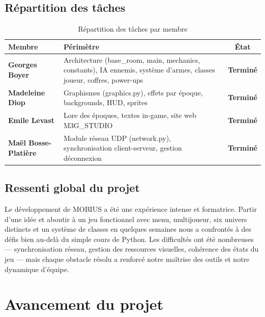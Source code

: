 \documentclass[12pt,a4paper]{article}
\begin{document}
\subsection{Répartition des tâches}

\begin{table}[H]
\centering
\caption{Répartition des tâches par membre}
\renewcommand{\arraystretch}{1.4}
\begin{tabularx}{\textwidth}{@{}>{\bfseries}lXc@{}}
\toprule
\rowcolor{tableheadbg}
\textbf{Membre} & \textbf{Périmètre} & \textbf{État} \\
\midrule
Georges Boyer       & Architecture (base\_room, main, mechanics, constants), IA ennemis, système d'armes, classes joueur, coffres, power-ups & \textcolor{okgreen}{\textbf{Terminé}} \\
\rowcolor{rowaltbg}
Madeleine Diop      & Graphismes (graphics.py), effets par époque, backgrounds, HUD, sprites & \textcolor{okgreen}{\textbf{Terminé}} \\
Emile Levast        & Lore des époques, textes in-game, site web M3G\_STUDIO & \textcolor{okgreen}{\textbf{Terminé}} \\
\rowcolor{rowaltbg}
Maël Bosse-Platière & Module réseau UDP (network.py), synchronisation client-serveur, gestion déconnexion & \textcolor{okgreen}{\textbf{Terminé}} \\
\bottomrule
\end{tabularx}
\end{table}

\subsection{Ressenti global du projet}

Le développement de MOBIUS a été une expérience intense et formatrice. Partir d'une idée et aboutir à un jeu fonctionnel avec menu, multijoueur, six univers distincts et un système de classes en quelques semaines nous a confrontés à des défis bien au-delà du simple cours de Python. Les difficultés ont été nombreuses --- synchronisation réseau, gestion des ressources visuelles, cohérence des états du jeu --- mais chaque obstacle résolu a renforcé notre maîtrise des outils et notre dynamique d'équipe.

\newpage
\section{Avancement du projet}
\end{document}
